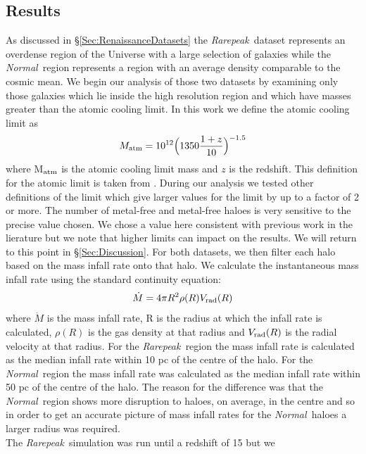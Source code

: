 \documentclass[graphics, twocolumn, usenatbib]{mn2e}
\newcommand{\rarepeak} {\textit{Rarepeak~}}
\newcommand{\normal} {\textit{Normal~}}
\begin{document}
\subsection{Results} \label{Sec:Results}

As discussed in \S \ref{Sec:RenaissanceDatasets} the \rarepeak dataset represents an overdense
region of the Universe with a large selection of galaxies while the \normal region represents a
region with an average density comparable to the cosmic mean. We begin our analysis of those two
datasets by examining only those galaxies which lie inside the high resolution region and which
have masses greater than the atomic cooling limit. In this work we define the atomic cooling
limit as
\begin{equation}
  M_{\rm atm} = 10^{12} \Big (1350 { {1 + z} \over {10}} \Big )^{-1.5} 
\end{equation}
where M$_{\rm atm}$ is the atomic cooling limit mass and $z$ is the redshift.
This definition for the atomic limit is taken from \cite{Fernandez_2014}. During our analysis
we tested other definitions of the limit \citep[e.g.][]{Bromm_2011} which give larger
values for the limit by up to a factor of 2 or more. The number of metal-free and metal-free haloes
is very sensitive to the precise value chosen. We chose a value here consistent with previous
work in the lierature but we note that higher limits can impact on the results. We will return to
this point in \S \ref{Sec:Discussion}.
For both datasets, we then filter each halo based on the mass infall rate onto that halo.
We calculate the instantaneous mass infall rate using the standard continuity equation:
\begin{equation}  
  \dot{M} = 4 \pi R^2 \rho(R) V_{\rm rad}(R)
\end{equation}
where  $\dot{M}$ is the mass infall rate, R is the radius at which the infall rate is calculated,
$\rho(R)$ is the gas density at that radius and $V_{\rm rad}(R)$ is the radial velocity at that radius.
For the \rarepeak region the mass infall rate is calculated as the median infall rate within 10 pc
of the centre of the halo. For the \normal region  the mass infall rate was calculated as the median
infall rate within 50 pc of the centre of the halo. The reason for the difference was
that the \normal region shows more disruption to haloes, on average, in the centre and so in
order to get an accurate picture of mass infall rates for the \normal haloes a larger radius
was required. \\
\indent The \rarepeak simulation was run until a redshift of 15 but we
\end{document}
